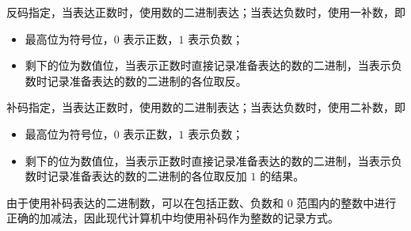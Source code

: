             反码指定，当表达正数时，使用数的二进制表达；当表达负数时，使用一补数，即
            \begin{itemize}
                \item 最高位为符号位，$0$ 表示正数，$1$ 表示负数；
                \item 剩下的位为数值位，当表示正数时直接记录准备表达的数的二进制，当表示负数时记录准备表达的数的二进制的各位取反。
            \end{itemize}

            补码指定，当表达正数时，使用数的二进制表达；当表达负数时，使用二补数，即
            \begin{itemize}
                \item 最高位为符号位，$0$ 表示正数，$1$ 表示负数；
                \item 剩下的位为数值位，当表示正数时直接记录准备表达的数的二进制，当表示负数时记录准备表达的数的二进制的各位取反加 $1$ 的结果。
            \end{itemize}

            由于使用补码表达的二进制数，可以在包括正数、负数和 0 范围内的整数中进行正确的加减法，因此现代计算机中均使用补码作为整数的记录方式。
